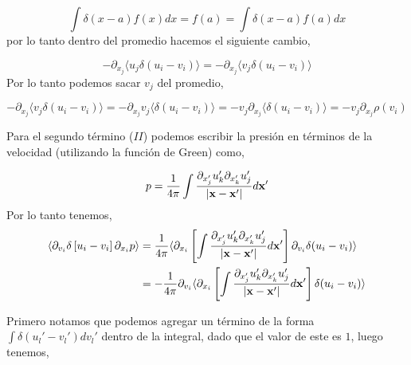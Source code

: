 \documentclass[executivepaper,12pt]{article}
\numberwithin{equation}{section}
\providecommand{\abs}[1]{\lvert#1\rvert}
\begin{document}
\begin{equation*}
	\int \delta(x-a)f(x)dx=f(a)=\int \delta(x-a)f(a) dx
\end{equation*}
por lo tanto dentro del promedio hacemos el siguiente cambio,

\begin{equation*}
	-\partial_{x_j} \langle u_j\delta(u_i-v_i) \rangle=-\partial_{x_j} \langle v_j\delta(u_i-v_i) \rangle
\end{equation*}
Por lo tanto podemos sacar $v_j$ del promedio,

\begin{equation*}
	-\partial_{x_j} \langle v_j\delta(u_i-v_i) \rangle=-\partial_{x_j} v_j\langle\delta(u_i-v_i) \rangle=-v_j\partial_{x_j} \langle\delta(u_i-v_i) \rangle=-v_j\partial_{x_j} \rho(v_i)
\end{equation*}

Para el segundo término ($II$) podemos escribir la presión en términos de la velocidad (utilizando la función de Green) como,

\begin{equation*}
	p=\frac{1}{4\pi}\int \frac{\partial_{x'_j} u'_k\partial_{x'_k} u'_j}{\abs{\vb{x}-\vb{x'}}}d\vb{x'}
\end{equation*}
Por lo tanto tenemos,
\begin{align*}
	\langle \partial_{v_i} \delta\left[u_i-v_i\right]\partial_{x_i} p \rangle&=\frac{1}{4\pi}\langle \partial_{x_i} \left[\int \frac{\partial_{x'_j} u'_k\partial_{x'_k} u'_j}{\abs{\vb{x}-\vb{x'}}}d\vb{x'} \right]  \partial_{v_i}\delta(u_i-v_i)\rangle\\
	&=-\frac{1}{4\pi}\partial_{v_i}\langle \partial_{x_i} \left[\int \frac{\partial_{x'_j} u'_k\partial_{x'_k} u'_j}{\abs{\vb{x}-\vb{x'}}}d\vb{x'}\right]   \delta(u_i-v_i)\rangle
\end{align*}

Primero notamos que podemos agregar un término de la forma $\int  \delta(u_l'-v_l') dv_l'$ dentro de la integral, dado que el valor de este es $1$, luego tenemos,
\end{document}
